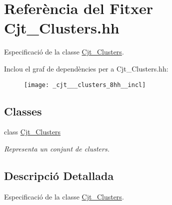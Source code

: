 \hypertarget{_cjt___clusters_8hh}{}\section{Referència del Fitxer Cjt\+\_\+\+Clusters.\+hh}
\label{_cjt___clusters_8hh}


Especificació de la classe \hyperlink{class_cjt___clusters}{Cjt\+\_\+\+Clusters}.  


Inclou el graf de dependències per a Cjt\+\_\+\+Clusters.\+hh\+:\nopagebreak
\begin{figure}[H]
\begin{center}
\leavevmode
\texttt{[image: \_cjt\_\_\_clusters\_8hh\_\_incl]}
\end{center}
\end{figure}
\subsection*{Classes}
\begin{DoxyCompactItemize}
\item 
class \hyperlink{class_cjt___clusters}{Cjt\+\_\+\+Clusters}
\begin{DoxyCompactList}\small\item\em Representa un conjunt de clusters. \end{DoxyCompactList}\end{DoxyCompactItemize}


\subsection{Descripció Detallada}
Especificació de la classe \hyperlink{class_cjt___clusters}{Cjt\+\_\+\+Clusters}. 

